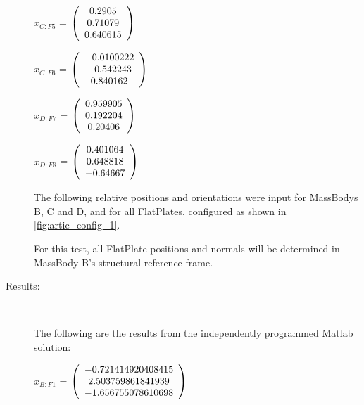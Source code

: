 \begin{description}
$\hat{x}_{C:F5}$ = $\left( \begin{array} {ccc}     0.2905 \\    0.71079 \\   0.640615
\end{array} \right)\\ \\$

$\hat{x}_{C:F6}$ = $\left( \begin{array} {ccc} -0.0100222 \\  -0.542243 \\   0.840162
\end{array} \right)\\ \\$

$\hat{x}_{D:F7}$ = $\left( \begin{array} {ccc}   0.959905 \\   0.192204 \\    0.20406
\end{array} \right)\\ \\$

$\hat{x}_{D:F8}$ = $\left( \begin{array} {ccc}   0.401064 \\   0.648818 \\   -0.64667
\end{array} \right)\\ \\$

The following relative positions and orientations were input for MassBodys
B, C and D, and for all FlatPlates, configured as shown in
\ref{fig:artic_config_1}.

For this test, all FlatPlate positions and normals will be determined in
MassBody B's structural reference frame.

\item[Results:] \ \newline

The following are the results from the independently programmed Matlab solution:

$x_{B:F1}$  = $\left( \begin{array} {ccc} -0.721414920408415 \\ 2.503759861841939 \\ -1.656755078610698
\end{array} \right)\\ \\$


\end{description}
